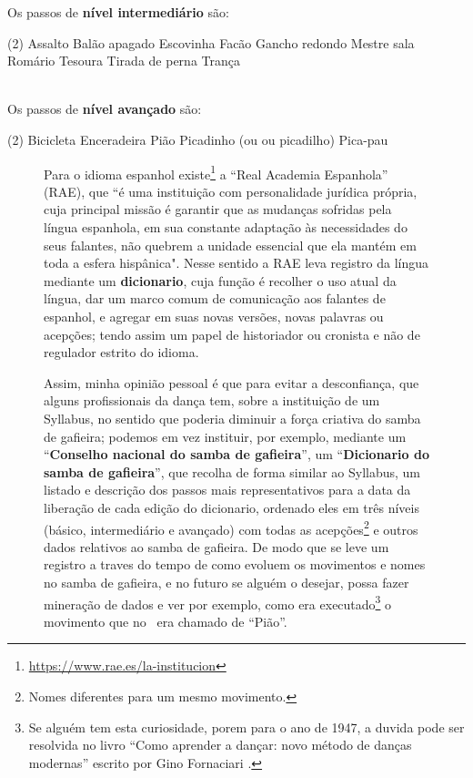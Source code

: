 Os passos de \textbf{nível intermediário} são:
\begin{tasks}(2)
\task Assalto
\task Balão apagado
\task Escovinha
\task Facão
\task Gancho redondo
\task Mestre sala
\task Romário
\task Tesoura
\task Tirada de perna
\task Trança
\end{tasks}~\\

Os passos de \textbf{nível avançado} são:
\begin{tasks}(2)
\task Bicicleta
\task Enceradeira
\task Pião
\task Picadinho (ou ou picadilho)
\task Pica-pau
\end{tasks}



\begin{figure}[t]
\begin{elaboracion}[title=Necessidade e alternativas ao Syllabus]

Para o idioma espanhol existe\footnote{\url{https://www.rae.es/la-institucion}} a ``Real Academia Espanhola'' (RAE),
que ``é uma instituição com personalidade jurídica própria, cuja principal missão é garantir 
que as mudanças sofridas pela língua espanhola, 
em sua constante adaptação às necessidades do seus falantes, 
não quebrem a unidade essencial que ela mantém em toda a esfera hispânica".
Nesse sentido a RAE leva registro da língua mediante um \textbf{dicionario},
cuja função é recolher o uso atual da língua, dar um marco comum de comunicação aos falantes de espanhol,
e agregar em suas novas versões, novas palavras ou acepções;
tendo assim um papel de historiador ou cronista e não de regulador estrito do idioma.

Assim, minha opinião pessoal é que para evitar a desconfiança, que alguns profissionais da dança tem,
sobre a instituição de um Syllabus, no sentido  que poderia diminuir a força criativa do samba de gafieira;
podemos em vez instituir, por exemplo, mediante um ``\textbf{Conselho nacional do samba de gafieira}'',
um ``\textbf{Dicionario do samba de gafieira}'', que recolha de forma similar ao Syllabus,
um listado e descrição dos passos mais representativos para a data da liberação de cada edição do dicionario, 
ordenado eles em três níveis (básico, intermediário e avançado) 
com todas as acepções\footnote{Nomes diferentes para um mesmo movimento.}
e outros dados relativos ao samba de gafieira.
De modo que se leve um registro a traves do tempo de como evoluem os movimentos e nomes no samba de gafieira,
e no futuro se alguém o desejar, possa fazer mineração de dados e ver 
por exemplo, como era executado\footnote{Se alguém tem esta curiosidade,
porem para o ano de 1947, a duvida pode ser resolvida no livro
``Como aprender a dançar: novo método de danças modernas'' escrito por Gino Fornaciari \cite[pp. 72]{fornaciari1947aprender}.} 
o movimento que no \AnoLivro~era chamado de ``Pião''.
\end{elaboracion}
\label{fig:ImportanciaSyllabus}
\end{figure}


